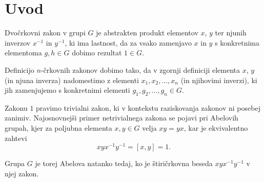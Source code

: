 \section{Uvod}




Dvočrkovni zakon v grupi $G$ je abstrakten produkt elementov $x$, $y$ ter njunih inverzov $x^{-1}$ in $y^{-1}$, ki ima lastnost, da za vsako zamenjavo $x$ in $y$ s konkretnima
elementoma $g, h \in G$ dobimo rezultat $1 \in G$.

\begin{opomba}
Definicijo $n$-črkovnih zakonov dobimo tako, da v zgornji definiciji elementa $x$, $y$ (in njuna inverza) nadomestimo z elementi $x_1, x_2, \ldots, x_n$ (in njihovimi inverzi),
ki jih zamenjujemo s konkretnimi elementi $g_1, g_2, \ldots, g_{n} \in G$.
\end{opomba}


Zakonu $1$ pravimo trivialni zakon, ki v kontekstu raziskovanja zakonov ni posebej zanimiv. Najosnovnejši primer netrivialnega zakona se pojavi pri Abelovih grupah, kjer za poljubna elementa $x,y \in  G$ velja $xy = yx$, kar je ekvivalentno
zahtevi \begin{equation*}
xyx^{-1}y^{-1} = [x,y] = 1.
\end{equation*}

Grupa $G$ je torej Abelova natanko tedaj, ko je štiričrkovna beseda $xyx^{-1}y^{-1}$ v njej zakon. 
